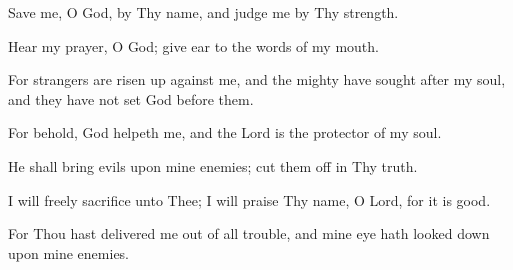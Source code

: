 Save me, O God, by Thy name, and judge me by Thy strength.

Hear my prayer, O God; give ear to the words of my mouth.

For strangers are risen up against me, and the mighty have sought after my soul, and they have not set God before them.

For behold, God helpeth me, and the Lord is the protector of my soul.

He shall bring evils upon mine enemies; cut them off in Thy truth.

I will freely sacrifice unto Thee; I will praise Thy name, O Lord, for it is good.

For Thou hast delivered me out of all trouble, and mine eye hath looked down upon mine enemies.
